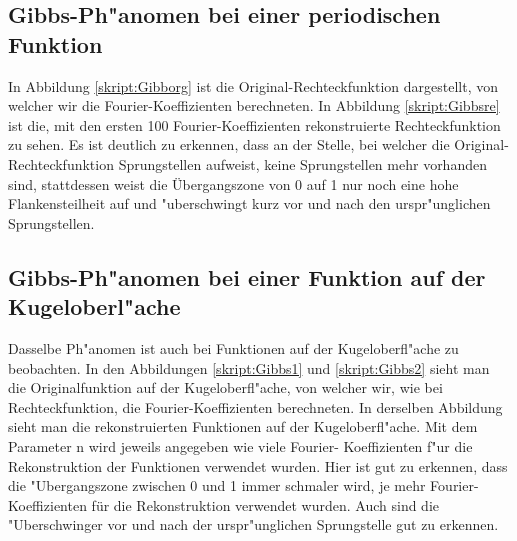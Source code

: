 \begin{refsection}
\subsection{Gibbs-Ph"anomen bei einer periodischen Funktion}
In Abbildung \ref{skript:Gibborg} ist die Original-Rechteckfunktion 
dargestellt, von welcher wir die Fourier-Koeffizienten berechneten. 
In Abbildung \ref{skript:Gibbsre} ist die, mit den ersten 100 
Fourier-Koeffizienten rekonstruierte Rechteckfunktion zu sehen. 
Es ist deutlich zu erkennen, dass an der Stelle, bei welcher die 
Original-Rechteckfunktion Sprungstellen aufweist, keine Sprungstellen 
mehr vorhanden sind, stattdessen weist die Übergangszone von 0 auf 1 
nur noch eine hohe Flankensteilheit auf und "uberschwingt kurz vor und 
nach den urspr"unglichen Sprungstellen.

\subsection{Gibbs-Ph"anomen bei einer Funktion auf der Kugeloberl"ache}
Dasselbe Ph"anomen ist auch bei Funktionen auf der Kugeloberfl"ache 
zu beobachten. 
In den Abbildungen \ref{skript:Gibbs1} und \ref{skript:Gibbs2} sieht 
man die Originalfunktion auf der Kugeloberfl"ache, von welcher wir, 
wie bei Rechteckfunktion, die Fourier-Koeffizienten berechneten. 
In derselben Abbildung sieht man die rekonstruierten Funktionen auf 
der Kugeloberfl"ache. 
Mit dem Parameter n wird jeweils angegeben wie viele Fourier-
Koeffizienten f"ur die Rekonstruktion der Funktionen verwendet wurden. 
Hier ist gut zu erkennen, dass die "Ubergangszone zwischen 0 und 1 
immer schmaler wird, je mehr Fourier-Koeffizienten für die 
Rekonstruktion verwendet wurden. 
Auch sind die "Uberschwinger vor und nach der urspr"unglichen 
Sprungstelle gut zu erkennen.


\end{refsection}
